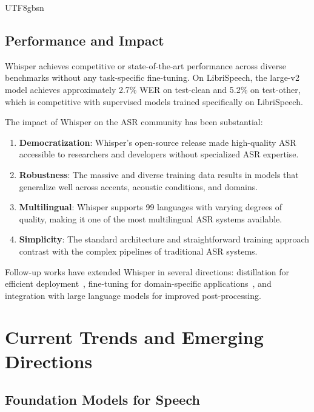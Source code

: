 \documentclass[12pt,a4paper]{article}
\begin{document}
\begin{CJK}{UTF8}{gbsn}
\subsection{Performance and Impact}

Whisper achieves competitive or state-of-the-art performance across diverse benchmarks without any task-specific fine-tuning. On LibriSpeech, the large-v2 model achieves approximately 2.7\% WER on test-clean and 5.2\% on test-other, which is competitive with supervised models trained specifically on LibriSpeech.

The impact of Whisper on the ASR community has been substantial:
\begin{enumerate}[leftmargin=*]
    \item \textbf{Democratization}: Whisper's open-source release made high-quality ASR accessible to researchers and developers without specialized ASR expertise.
    \item \textbf{Robustness}: The massive and diverse training data results in models that generalize well across accents, acoustic conditions, and domains.
    \item \textbf{Multilingual}: Whisper supports 99 languages with varying degrees of quality, making it one of the most multilingual ASR systems available.
    \item \textbf{Simplicity}: The standard architecture and straightforward training approach contrast with the complex pipelines of traditional ASR systems.
\end{enumerate}

Follow-up works have extended Whisper in several directions: distillation for efficient deployment~\cite{tian2023few}, fine-tuning for domain-specific applications~\cite{wang2023benchmarking}, and integration with large language models for improved post-processing.

\section{Current Trends and Emerging Directions}
\label{sec:trends}

\subsection{Foundation Models for Speech}
\label{subsec:foundations}


\end{CJK}
\end{document}
